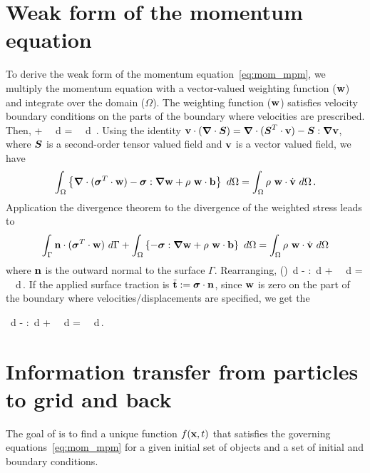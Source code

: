 \section{Weak form of the momentum equation} \label{sec:weak_form}
To derive the weak form of the momentum equation~\eqref{eq:mom_mpm}, we multiply the 
momentum equation with a vector-valued weighting function ($\mathbf{w}$) and
integrate over the domain ($\Omega$).  The weighting function ($\mathbf{w}$)
satisfies velocity boundary conditions on the parts of the boundary
where velocities are prescribed.  Then,
\Beq
  \IntOmega \Bdot{\Bw}
                 {\LBs\Div{\Bsig} + \rho~\Bb\RBs}~d\Omega 
     = \IntOmega \rho~\Bdot{\Bw}{\dot{\Bv}}~d\Omega ~.
\Eeq
Using the identity 
$\mathbf{v}\cdot(\boldsymbol{\nabla}\cdot\boldsymbol{S}) = \boldsymbol{\nabla}\cdot(\boldsymbol{S}^T\cdot\mathbf{v}) - \boldsymbol{S}:\boldsymbol{\nabla} \mathbf{v}$, 
where $\boldsymbol{S}$ is a second-order tensor valued field and $\mathbf{v}$ is a 
vector valued field, we have
\begin{equation*}
  \int_{\Omega} \left\{
     \boldsymbol{\nabla}\cdot(\boldsymbol{\sigma}^T\cdot\mathbf{w}) - \boldsymbol{\sigma}:\boldsymbol{\nabla} \mathbf{w} +
     \rho~\mathbf{w}\cdot\mathbf{b}\right\}~d\Omega 
     = \int_{\Omega} \rho~\mathbf{w}\cdot\dot{\mathbf{v}}~d\Omega \,.
\end{equation*}
Application the divergence theorem to the divergence of the weighted stress leads to
\begin{equation*}
  \int_{\Gamma} \mathbf{n}\cdot(\boldsymbol{\sigma}^T\cdot\mathbf{w}) ~d\Gamma + 
  \int_{\Omega} \left\{ - \boldsymbol{\sigma}:\boldsymbol{\nabla} \mathbf{w} + \rho~\mathbf{w}\cdot\mathbf{b}\right\}~d\Omega 
     = \int_{\Omega} \rho~\mathbf{w}\cdot\dot{\mathbf{v}}~d\Omega  
\end{equation*}
where $\mathbf{n}$ is the outward normal to the surface $\Gamma$.  Rearranging,
\Beq
  \IntGamma (\Bsig\cdot\Bn)\cdot\Bw ~d\Gamma  
  - \IntOmega \Bsig:\Grad{\Bw}~d\Omega  
  + \IntOmega \rho~\Bdot{\Bw}{\Bb}~d\Omega
  = \IntOmega \rho~\Bdot{\Bw}{\dot{\Bv}}~d\Omega  \,.
\Eeq
If the applied surface traction is $\Bart := \Bdot{\Bsig}{\Bn}$, 
since $\mathbf{w}$ is zero on the part of the boundary where velocities/displacements
are specified, we get the 
\begin{NoteBox}
\Beq \label{eq:weak_form}
  \IntGammat \Bart\cdot\Bw ~d\Gamma  
  - \IntOmega \Bsig:\Grad{\Bw}~d\Omega  
  + \IntOmega \rho~\Bdot{\Bw}{\Bb}~d\Omega
  = \IntOmega \rho~\Bdot{\Bw}{\dot{\Bv}}~d\Omega  \,.
\Eeq
\end{NoteBox}

\section{Information transfer from particles to grid and back} \label{sec:projection}
The goal of \MPM is to find a unique function $f(\mathbf{x},t)$ that satisfies the governing
equations~\eqref{eq:mom_mpm} for a given initial set of objects and a set of initial
and boundary conditions.

